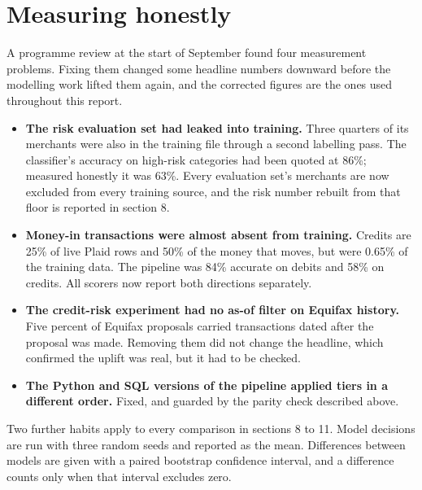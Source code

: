 \section{Measuring honestly}
A programme review at the start of September found four measurement problems. Fixing them changed some headline numbers downward before the modelling work lifted them again, and the corrected figures are the ones used throughout this report.

\begin{itemize}
\item \textbf{The risk evaluation set had leaked into training.} Three quarters of its merchants were also in the training file through a second labelling pass. The classifier's accuracy on high-risk categories had been quoted at 86\%; measured honestly it was 63\%. Every evaluation set's merchants are now excluded from every training source, and the risk number rebuilt from that floor is reported in section 8.
\item \textbf{Money-in transactions were almost absent from training.} Credits are 25\% of live Plaid rows and 50\% of the money that moves, but were 0.65\% of the training data. The pipeline was 84\% accurate on debits and 58\% on credits. All scorers now report both directions separately.
\item \textbf{The credit-risk experiment had no as-of filter on Equifax history.} Five percent of Equifax proposals carried transactions dated after the proposal was made. Removing them did not change the headline, which confirmed the uplift was real, but it had to be checked.
\item \textbf{The Python and SQL versions of the pipeline applied tiers in a different order.} Fixed, and guarded by the parity check described above.
\end{itemize}
Two further habits apply to every comparison in sections 8 to 11. Model decisions are run with three random seeds and reported as the mean. Differences between models are given with a paired bootstrap confidence interval, and a difference counts only when that interval excludes zero.

